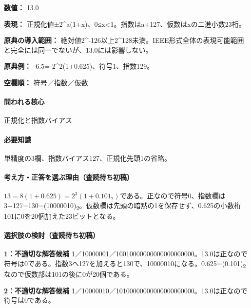 \noindent\textbf{数値：} 13.0\par

\noindent\textbf{表現：} 正規化値±2\textasciicircum{}a(1+x)、0≤x<1。指数はa+127、仮数はxの二進小数23桁。\par

\noindent\textbf{原典の導入範囲：} 絶対値2\textasciicircum{}-126以上2\textasciicircum{}128未満。IEEE形式全体の表現可能範囲と完全には同一でないが、13.0には影響しない。\par

\noindent\textbf{原典例：} -6.5=-2\textasciicircum{}2(1+0.625)、符号1、指数129。\par

\noindent\textbf{空欄順：} 符号／指数／仮数\par

\paragraph{問われる核心} 正規化と指数バイアス

\paragraph{必要知識} 単精度の3欄、指数バイアス127、正規化先頭1の省略。

\paragraph{考え方・正答を選ぶ理由（査読待ち初稿）} \(13=8(1+0.625)=2^3(1+0.101_2)\)である。正なので符号0、指数欄は3+127=\allowbreak{}130=\allowbreak{}(10000010)\textsubscript{2}。仮数欄は先頭の暗黙の1を保存せず、0.625の小数桁101に0を20個加えた23ビットとなる。

\paragraph{選択肢の検討（査読待ち初稿）}\mbox{}\par

\noindent\textbf{1：不適切な解答候補} 1／10000001／10010000000000000000000。13.0は正なので符号は0である。指数3へ127を加えると130で、10000010になる。0.625=\allowbreak{}(0.101)\textsubscript{2}なので仮数部は101の後に0が20個である。\par

\noindent\textbf{2：不適切な解答候補} 1／10000010／10100000000000000000000。13.0は正なので符号は0である。\par

